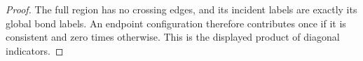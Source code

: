 \begin{proof}\leanok
    The full region has no crossing edges, and its incident labels
    are exactly its global bond labels. An endpoint configuration
    therefore contributes once if it is consistent and zero times
    otherwise. This is the displayed product of diagonal indicators.
\end{proof}
